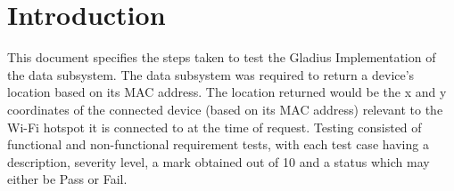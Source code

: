 \section{Introduction}
This document specifies the steps taken to test the Gladius Implementation of the data subsystem. The data subsystem was required to return a device's location based on its MAC address. The location returned would be the x and y coordinates of the connected device (based on its MAC address) relevant to the Wi-Fi hotspot it is connected to at the time of request. Testing consisted of functional and non-functional requirement tests, with each test case having a description, severity level, a mark obtained out of 10 and a status which may either be Pass or Fail.

